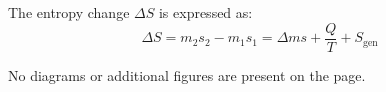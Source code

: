 The entropy change \( \Delta S \) is expressed as:  
\[
\Delta S = m_2 s_2 - m_1 s_1 = \Delta m s + \frac{Q}{T} + S_{\text{gen}}
\]  

No diagrams or additional figures are present on the page.